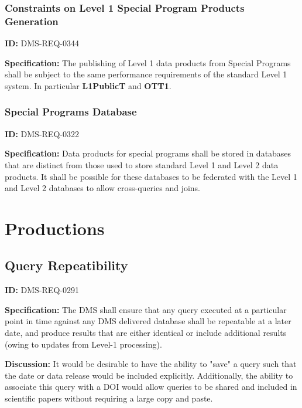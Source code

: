 \documentclass[SE,toc,lsstdraft]{lsstdoc}
\begin{document}
\subsubsection{Constraints on Level 1 Special Program Products Generation}

\label{DMS-REQ-0344}
\textbf{ID:} DMS-REQ-0344

\textbf{Specification: }The publishing of Level 1 data products from Special Programs shall be subject to the same performance requirements of the standard Level 1 system. In particular \textbf{L1PublicT} and \textbf{OTT1}.






\subsubsection{Special Programs Database}

\label{DMS-REQ-0322}
\textbf{ID:} DMS-REQ-0322

\textbf{Specification:} Data products for special programs shall be stored in databases that are distinct from those used to store standard Level 1 and Level 2 data products. It shall be possible for these databases to be federated with the Level 1 and Level 2 databases to allow cross-queries and joins.







\section{Productions}





\subsection{Query Repeatibility}

\label{DMS-REQ-0291}
\textbf{ID:} DMS-REQ-0291

\textbf{Specification:} The DMS shall ensure that any query executed at a particular point in time against any DMS delivered database shall be repeatable at a later date, and produce results that are either identical or include additional results (owing to updates from Level-1 processing).

\textbf{Discussion:} It would be desirable to have the ability to "save" a query such that the date or data release would be included explicitly. Additionally, the ability to associate this query with a DOI would allow queries to be shared and included in scientific papers without requiring a large copy and paste.
\end{document}
